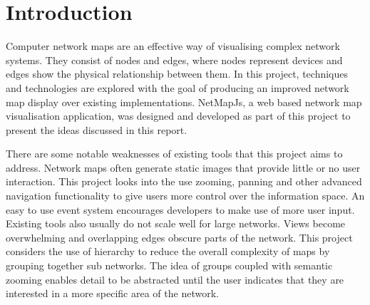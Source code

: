 \documentclass[11pt, a4paper]{article}
\begin{document}
\date{26/10/2011}

\tableofcontents

\abs{
}

\section{Introduction}
\label{sec:introduction}


Computer network maps are an effective way of visualising complex network
systems. They consist of nodes and edges, where nodes represent devices and edges
show the physical relationship between them. In this project, techniques and
technologies are explored with the goal of producing an improved network map
display over existing implementations. NetMapJs, a web based network map
visualisation application, was designed and developed as part of this project to
present the ideas discussed in this report.

 
There are some notable weaknesses of existing tools that this project aims to
address. Network maps often generate static images that provide little or no
user interaction. This project looks into the use zooming, panning and other
advanced navigation functionality to give users more control over the
information space. An easy to use event system encourages developers to make use
of more user input. Existing tools also usually do not scale well for large
networks. Views become overwhelming and overlapping edges obscure parts of the
network. This project considers the use of hierarchy to reduce the overall
complexity of maps by grouping together sub networks. The idea of groups coupled
with semantic zooming enables detail to be abstracted until the user indicates
that they are interested in a more specific area of the network.
\end{document}
